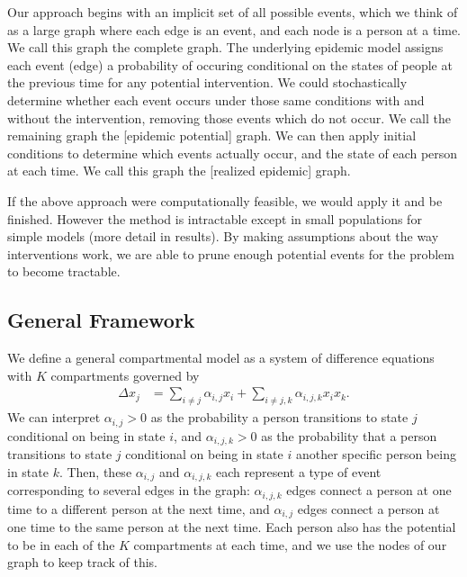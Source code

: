 \documentclass[PTRSB]{rsos}
\begin{document}
\begin{multicols}{2}
Our approach begins with an implicit set of all possible events, which we think of as a large graph where each edge is an event, and each node is a person at a time. %
We call this graph the complete graph.
The underlying epidemic model assigns each event (edge) a probability of occuring conditional on the states of people at the previous time for any potential intervention.
We could stochastically determine whether each event occurs under those same conditions with and without the intervention, removing those events which do not occur.
We call the remaining graph the [epidemic potential] graph.
We can then apply initial conditions to determine which events actually occur, and the state of each person at each time.
We call this graph the [realized epidemic] graph.

If the above approach were computationally feasible, we would apply it and be finished.
However the method is intractable except in small populations for simple models (more detail in results).
By making assumptions about the way interventions work, we are able to prune enough potential events for the problem to become tractable.

\subsection*{General Framework}
We define a general compartmental model as a system of difference equations with $K$ compartments governed by 
\begin{align*}
\Delta x_{j} &= \sum_{i \neq j} \alpha_{i,j}x_i + \sum_{i \neq j, k} \alpha_{i,j,k} x_ix_k.
\end{align*}
We can interpret $\alpha_{i,j} > 0$ as the probability a person transitions to state $j$ conditional on being in state $i$, and $\alpha_{i,j,k} > 0$ as the probability that a person transitions to state $j$ conditional on being in state $i$ another specific person being in state $k$.
Then, these $\alpha_{i,j}$ and $\alpha_{i,j,k}$ each represent a type of event corresponding to several edges in the graph: $\alpha_{i,j,k}$ edges connect a person at one time to a different person at the next time, and $\alpha_{i,j}$ edges connect a person at one time to the same person at the next time.
Each person also has the potential to be in each of the $K$ compartments at each time, and we use the nodes of our graph to keep track of this.


\end{multicols}
\end{document}
